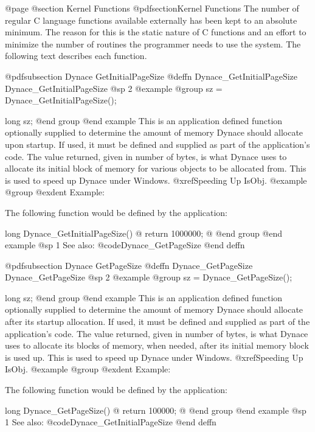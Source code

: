 {{{{@page
@section  Kernel Functions
@pdfsection{Kernel Functions}
The number of regular C language functions available externally
has been kept to an absolute minimum.  The reason for this is the
static nature of C functions and an effort to minimize the number
of routines the programmer needs to use the system.  The following
text describes each function.









@pdfsubsection {Dynace GetInitialPageSize}
@deffn {Dynace_GetInitialPageSize} Dynace_GetInitialPageSize
@sp 2
@example
@group
sz = Dynace_GetInitialPageSize();

long    sz;
@end group
@end example
This is an application defined function optionally supplied to determine
the amount of memory Dynace should allocate upon startup.  If used, it
must be defined and supplied as part of the application's code.  The value
returned, given in number of bytes, is what Dynace uses to allocate its
initial block of memory for various objects to be allocated from.
This is used to speed up Dynace under Windows.  @xref{Speeding Up IsObj}.
@example
@group
@exdent Example:

The following function would be defined by the application:

long    Dynace_GetInitialPageSize()
@{
        return 1000000;
@}        
@end group
@end example
@sp 1
See also:  @code{Dynace_GetPageSize}
@end deffn






@pdfsubsection {Dynace GetPageSize}
@deffn {Dynace_GetPageSize} Dynace_GetPageSize
@sp 2
@example
@group
sz = Dynace_GetPageSize();

long    sz;
@end group
@end example
This is an application defined function optionally supplied to determine
the amount of memory Dynace should allocate after its startup allocation.  If used, it
must be defined and supplied as part of the application's code.  The value
returned, given in number of bytes, is what Dynace uses to allocate its
blocks of memory, when needed, after its initial memory block is used up.
This is used to speed up Dynace under Windows.  @xref{Speeding Up IsObj}.
@example
@group
@exdent Example:

The following function would be defined by the application:

long    Dynace_GetPageSize()
@{
        return 100000;
@}        
@end group
@end example
@sp 1
See also:  @code{Dynace_GetInitialPageSize}
@end deffn










}}}}
